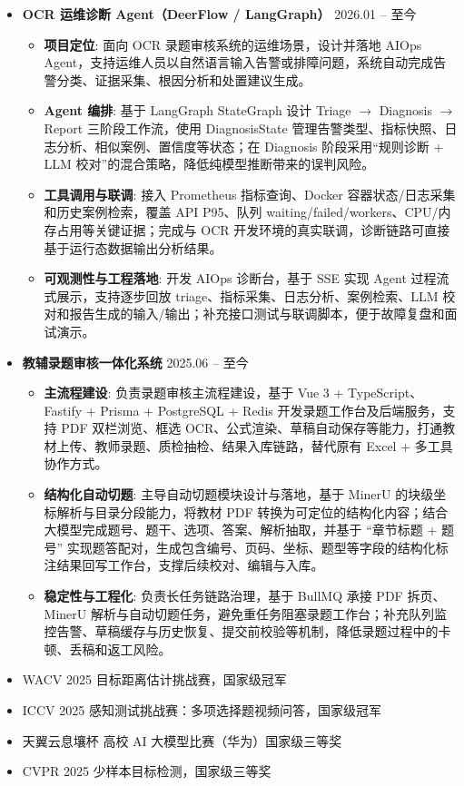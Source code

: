\documentclass[zh]{resume}
\begin{document}
\begin{itemize}
  \item \textbf{OCR 运维诊断 Agent（DeerFlow / LangGraph）} \hfill 2026.01 -- 至今
  \begin{itemize}
    \item \textbf{项目定位}: 面向 OCR 录题审核系统的运维场景，设计并落地 AIOps Agent，支持运维人员以自然语言输入告警或排障问题，系统自动完成告警分类、证据采集、根因分析和处置建议生成。
    \item \textbf{Agent 编排}: 基于 LangGraph StateGraph 设计 Triage $\rightarrow$ Diagnosis $\rightarrow$ Report 三阶段工作流，使用 DiagnosisState 管理告警类型、指标快照、日志分析、相似案例、置信度等状态；在 Diagnosis 阶段采用“规则诊断 + LLM 校对”的混合策略，降低纯模型推断带来的误判风险。
    \item \textbf{工具调用与联调}: 接入 Prometheus 指标查询、Docker 容器状态/日志采集和历史案例检索，覆盖 API P95、队列 waiting/failed/workers、CPU/内存占用等关键证据；完成与 OCR 开发环境的真实联调，诊断链路可直接基于运行态数据输出分析结果。
    \item \textbf{可观测性与工程落地}: 开发 AIOps 诊断台，基于 SSE 实现 Agent 过程流式展示，支持逐步回放 triage、指标采集、日志分析、案例检索、LLM 校对和报告生成的输入/输出；补充接口测试与联调脚本，便于故障复盘和面试演示。
  \end{itemize}

  \item \textbf{教辅录题审核一体化系统} \hfill 2025.06 -- 至今
  \begin{itemize}
    \item \textbf{主流程建设}: 负责录题审核主流程建设，基于 Vue 3 + TypeScript、Fastify + Prisma + PostgreSQL + Redis 开发录题工作台及后端服务，支持 PDF 双栏浏览、框选 OCR、公式渲染、草稿自动保存等能力，打通教材上传、教师录题、质检抽检、结果入库链路，替代原有 Excel + 多工具协作方式。
    \item \textbf{结构化自动切题}: 主导自动切题模块设计与落地，基于 MinerU 的块级坐标解析与目录分段能力，将教材 PDF 转换为可定位的结构化内容；结合大模型完成题号、题干、选项、答案、解析抽取，并基于 ``章节标题 + 题号'' 实现题答配对，生成包含编号、页码、坐标、题型等字段的结构化标注结果回写工作台，支撑后续校对、编辑与入库。
    \item \textbf{稳定性与工程化}: 负责长任务链路治理，基于 BullMQ 承接 PDF 拆页、MinerU 解析与自动切题任务，避免重任务阻塞录题工作台；补充队列监控告警、草稿缓存与历史恢复、提交前校验等机制，降低录题过程中的卡顿、丢稿和返工风险。
  \end{itemize}
\end{itemize}


\begin{itemize}
  \item WACV 2025 目标距离估计挑战赛，国家级冠军
  \item ICCV 2025 感知测试挑战赛：多项选择题视频问答，国家级冠军
  \item 天翼云息壤杯 高校 AI 大模型比赛（华为）国家级三等奖
  \item CVPR 2025 少样本目标检测，国家级三等奖
\end{itemize}
\end{document}
